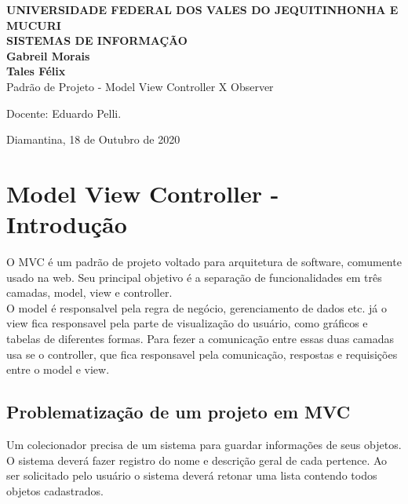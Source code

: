 \documentclass[a4paper]{article}
\begin{document}
  \begin{titlepage}
    \vfill
      \begin{center}
        {\large \textbf{UNIVERSIDADE FEDERAL DOS VALES DO JEQUITINHONHA E MUCURI}} \\[0.5cm]
        {\large \textbf{SISTEMAS DE INFORMAÇÃO}} \\[4cm]
        
        {\large \textbf{Gabreil Morais}}\\[1cm]
        {\large \textbf{Tales Félix}}\\[4cm]
    
        {\Large Padrão de Projeto - Model View Controller  X Observer }\\[4cm]
    
        \hspace{.45\textwidth} %
        \begin{minipage}{.5\textwidth}
        \large
        Docente: Eduardo Pelli.\\[8cm]
    \end{minipage}
    {\large Diamantina, 18 de Outubro de 2020}
    \end{center}
  \end{titlepage}


  \newpage
  
    \section{Model View Controller - Introdução}
    O MVC é um padrão de projeto voltado para arquitetura de software, comumente usado na
    web. Seu principal objetivo é a separação de funcionalidades em três camadas, model, view e controller.\\
    O model é responsalvel pela regra de negócio, gerenciamento de dados etc. já o view fica responsavel
    pela parte de visualização do usuário, como gráficos e tabelas de diferentes formas. Para fezer a comunicação
    entre essas duas camadas usa se o controller, que fica responsavel pela comunicação, respostas e requisições
    entre o model e view.
    \subsection{Problematização de um projeto em MVC}
    Um colecionador precisa de um sistema para guardar informações de seus objetos.
    O sistema deverá fazer registro do nome e descrição geral de cada pertence.
    Ao ser solicitado pelo usuário o sistema deverá retonar uma lista contendo
    todos objetos cadastrados.
    
\end{document}
